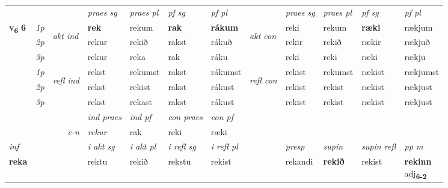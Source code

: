 \begin{longtable}[l]{X>{\footnotesize\itshape}llXXXXlXXXX}
\midrule

 & &   & \textit{praes sg}  & \textit{praes pl}    & \textit{ pf sg} & \textit{pf pl} & & \textit{praes sg}  & \textit{praes pl}    & \textit{pf sg} & \textit{pf pl }  \\ \cmidrule{4-7} \cmidrule{9-12}
 \multirow{2}{*}{{{\textbf{v{\textsubscript{6}}} \Large{\textbf{6}}}}}  & 1p & \multirow{3}{*}{\begin{turn}{90}\textit{akt ind}\end{turn}} & \textbf{rek} & rekum & \textbf{rak} & \textbf{rákum} & \multirow{3}{*}{\begin{turn}{90}\textit{akt con}\end{turn}} &reki & rekum & \textbf{ræki} & rækjum\\*
 & 2p &  &  rekur  & rekið & rakst & rákuð & & rekir & rekið & rækir & rækjuð \\*
 & 3p &  & rekur & reka & rak & ráku & & reki & reki& ræki & rækju \\*
\cmidrule{4-7} \cmidrule{9-12}
 & 1p & \multirow{3}{*}{\begin{turn}{90}\textit{refl ind}\end{turn}}  & rekst & rekumst & rakst & rákumst & \multirow{3}{*}{\begin{turn}{90}\textit{refl con}\end{turn}}  &rekist & rekumst & rækist & rækjumst \\*
 & 2p &  & rekst & rekist & rakst & rákust & &rekist & rekist & rækist & rækjust \\*
 & 3p  & & rekst & rekast & rakst & rákust & & rekist & rekist& rækist & rækjust \\*
\cmidrule{4-7} \cmidrule{9-12}

   && &  \textit{ind praes} & \textit{ind pf} & \textit{con praes} & \textit{con pf} \\*
\multicolumn{3}{r}{\textit{e-n}} & rekur & rak & reki & ræki \\*

\cmidrule{4-7}
   {\textit{inf}} & &  & \textit{i akt sg} & \textit{i akt pl} & \textit{i refl sg} & \textit{i refl pl} && \textit{presp} & \textit{supin} & \textit{supin refl} & \textit{pp m} \\*
  {\textbf{reka}} & && rektu  & rekið & rekstu & rekist && rekandi &  \textbf{rekið} & rekist & \specialcell{\textbf{rekinn} \\ adj\textbf{\textsubscript{6-2}}} \\*


\end{longtable}
